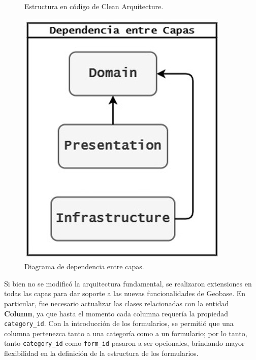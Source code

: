 \documentclass{article}
\begin{document}
\begin{figure}[H]
\begin{minipage}[b]{0.4\textwidth}
    \caption{Estructura en código de Clean Arquitecture.}
    \label{fig:cleanarquitecturecode}
  \end{minipage}
  \hspace{0.02\textwidth}
  \begin{minipage}[b]{0.4\textwidth}
    \centering
    \includegraphics[width=\textwidth]{images/clean_arq_dependences.jpg}
    \caption{Diagrama de dependencia entre capas.}
    \label{fig:cleanarquitecturedependences}
  \end{minipage}
  \label{fig:mer_comparacion}
\end{figure}

Si bien no se modificó la arquitectura fundamental, se realizaron extensiones en todas las capas para dar soporte a las nuevas funcionalidades de Geobase. En particular, fue necesario actualizar las clases relacionadas con la entidad \textbf{Column}, ya que hasta el momento cada columna requería la propiedad \texttt{category\_id}. Con la introducción de los formularios, se permitió que una columna pertenezca tanto a una categoría como a un formulario; por lo tanto, tanto \texttt{category\_id} como \texttt{form\_id} pasaron a ser opcionales, brindando mayor flexibilidad en la definición de la estructura de los formularios.
\end{document}
